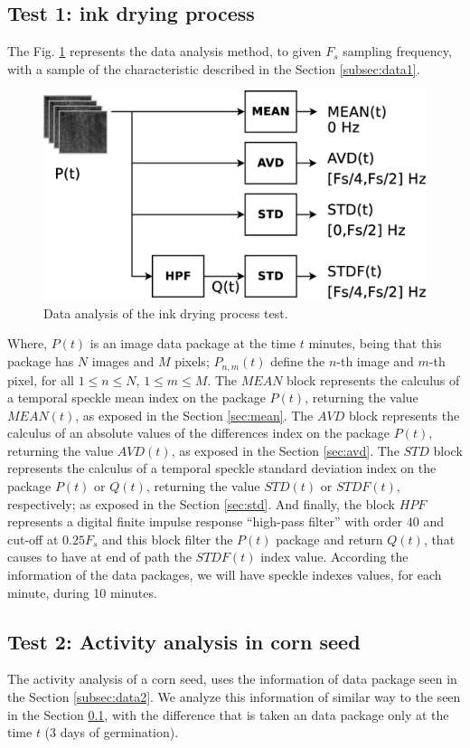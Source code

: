 \documentclass[review]{elsarticle}
\begin{document}
\subsection{Test 1: ink drying process}
\label{subsec:test1}
The Fig. \ref{fig:test1} represents the data analysis method, 
to given  $F_s$ sampling frequency, 
with a sample of the characteristic described in the Section \ref{subsec:data1}.
\begin{figure}[ht!]
\centering
\includegraphics[width=0.55\columnwidth]{test1.eps}
\caption{Data analysis of the ink drying process test.}
\label{fig:test1}
\end{figure}
Where, $P(t)$ is an image data package at the time $t$ minutes, 
being that this package has $N$ images and $M$ pixels; $P_{n,m}(t)$ 
define the $n$-th image and $m$-th pixel, for all $1 \leq n \leq N$, $1 \leq m \leq M$.
The $MEAN$ block represents the calculus of a temporal speckle mean index on 
the package $P(t)$, returning the value $MEAN(t)$, as exposed in the Section \ref{sec:mean}. 
The $AVD$ block represents the calculus of an absolute values of the differences index on
the package $P(t)$, returning the value $AVD(t)$, as exposed in the Section \ref{sec:avd}. 
The $STD$ block represents the calculus of a temporal speckle standard deviation index on 
the package $P(t)$ or $Q(t)$, returning the value $STD(t)$ or $STDF(t)$, respectively; as exposed in the Section \ref{sec:std}.
And finally,
the block $HPF$ represents a digital finite impulse response ``high-pass filter'' 
with order $40$ and cut-off at $0.25F_s$ and this block filter the $P(t)$ package and return $Q(t)$,
that causes to have at end of path the $STDF(t)$ index value.
According the information of the data packages, 
we will have speckle indexes values, for each minute, during 10 minutes.

\subsection{Test 2: Activity analysis in corn seed}
\label{subsec:test2}
The activity analysis of a corn seed, 
uses the information of data package seen in the Section \ref{subsec:data2}.
We analyze this information of similar way to the seen in the Section \ref{subsec:test1},
with the difference that is taken an data package only at the time $t$ (3 days of germination).
\end{document}
